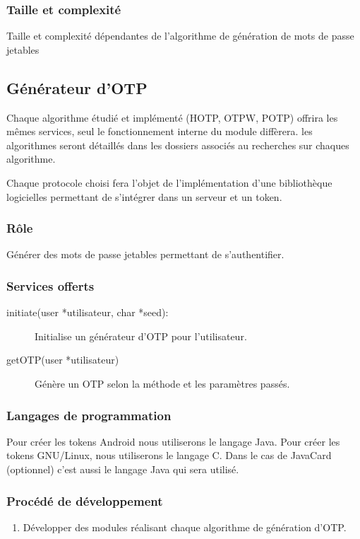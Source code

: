 \documentclass{"../../res/univ-projet"}
\begin{document}
    \subsubsection{Taille et complexité}
            Taille et complexité dépendantes de l'algorithme de génération
        de mots de passe jetables

\subsection{Générateur d'OTP}
    Chaque algorithme étudié et implémenté (HOTP, OTPW, POTP) offrira les
    mêmes services, seul le fonctionnement interne du module diffèrera.
    les algorithmes seront détaillés dans les dossiers associés au recherches sur 
    chaques algorithme.
    
        Chaque protocole choisi fera l'objet de l'implémentation d'une bibliothèque
    logicielles permettant de s'intégrer dans un serveur et un token.
    \subsubsection{Rôle}
        Générer des mots de passe jetables permettant de s'authentifier.

    \subsubsection{Services offerts}
    \begin{description}
        \item[initiate(user *utilisateur, char *seed):] Initialise
            un générateur d'OTP pour l'utilisateur.
        \item[getOTP(user *utilisateur)] Génère un OTP selon la méthode et les
            paramètres passés.
    \end{description}

    \subsubsection{Langages de programmation}
        Pour créer les tokens Android nous utiliserons le langage Java.
    Pour créer les tokens GNU/Linux, nous utiliserons le langage C.
    Dans le cas de JavaCard (optionnel) c'est aussi le langage Java qui sera
    utilisé.

    \subsubsection{Procédé de développement}
    \begin{enumerate}
        \item Développer des modules réalisant chaque algorithme de génération
            d'OTP.
    \end{enumerate}
\end{document}
